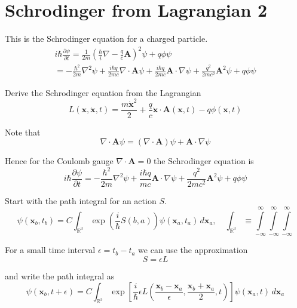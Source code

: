 


\section*{Schrodinger from Lagrangian 2}

This is the Schrodinger equation for a charged particle.
\begin{multline*}
i\hbar\frac{\partial\psi}{\partial t}
=\frac{1}{2m}\left(\frac{\hbar}{i}\nabla-\frac{q}{c}\mathbf A\right)^2\psi+q\phi\psi
\\
=-\frac{\hbar^2}{2m}\nabla^2\psi
+\frac{i\hbar q}{2mc}\nabla\cdot\mathbf A\psi
+\frac{i\hbar q}{2mc}\mathbf A\cdot\nabla\psi
+\frac{q^2}{2mc^2}\mathbf A^2\psi
+q\phi\psi
\end{multline*}

Derive the Schrodinger equation from the Lagrangian
\begin{equation*}
L(\mathbf x,\dot{\mathbf x},t)=\frac{m\dot{\mathbf x}^2}{2}
+\frac{q}{c}\dot{\mathbf x}\cdot\mathbf A(\mathbf x,t)-q\phi(\mathbf x,t)
\end{equation*}

Note that
\begin{equation*}
\nabla\cdot\mathbf A\psi=(\nabla\cdot\mathbf A)\psi+\mathbf A\cdot\nabla\psi
\end{equation*}

Hence for the Coulomb gauge $\nabla\cdot\mathbf A=0$ the Schrodinger equation is
\begin{equation*}
i\hbar\frac{\partial\psi}{\partial t}
=-\frac{\hbar^2}{2m}\nabla^2\psi
+\frac{i\hbar q}{mc}\mathbf A\cdot\nabla\psi
+\frac{q^2}{2mc^2}\mathbf A^2\psi
+q\phi\psi
\tag{1}
\end{equation*}

Start with the path integral for an action $S$.
\begin{equation*}
\psi(\mathbf x_b,t_b)
=C\int_{\mathbb R^3}\exp\left(\frac{i}{\hbar}S(b,a)\right)
\psi(\mathbf x_a,t_a)\,d\mathbf x_a,\quad
\int_{\mathbb R^3}\equiv\int\limits_{-\infty}^\infty\int\limits_{-\infty}^\infty\int\limits_{-\infty}^\infty
\end{equation*}

For a small time interval $\epsilon=t_b-t_a$ we can use the approximation
\begin{equation*}
S=\epsilon L
\end{equation*}

and write the path integral as
\begin{equation*}
\psi(\mathbf x_b,t+\epsilon)=C\int_{\mathbb R^3}
\exp\left[\frac{i}{\hbar}
\epsilon L\left(\frac{\mathbf x_b-\mathbf x_a}{\epsilon},\frac{\mathbf x_b+\mathbf x_a}{2},t\right)
\right]
\psi(\mathbf x_a,t)\,d\mathbf x_a
\end{equation*}

